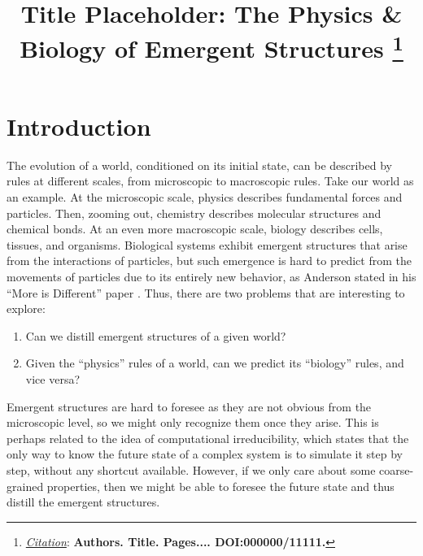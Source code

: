 \documentclass{article}
\title{Title Placeholder: The Physics \& Biology of Emergent Structures
\thanks{\textit{\underline{Citation}}: 
\textbf{Authors. Title. Pages.... DOI:000000/11111.}} 
}
\begin{document}
\maketitle


\begin{abstract}

\end{abstract}




\section{Introduction}

The evolution of a world, conditioned on its initial state, can be described by rules at different scales, from microscopic to macroscopic rules. 
Take our world as an example. 
At the microscopic scale, physics describes fundamental forces and particles. 
Then, zooming out, chemistry describes molecular structures and chemical bonds. 
At an even more macroscopic scale, biology describes cells, tissues, and organisms. 
Biological systems exhibit emergent structures that arise from the interactions of particles, but such emergence is hard to predict from the movements of particles due to its entirely new behavior, as Anderson stated in his ``More is Different'' paper \cite{anderson_more_1972}.  
Thus, there are two problems that are interesting to explore:
\begin{enumerate}
  \item Can we distill emergent structures of a given world?
  \item Given the ``physics'' rules of a world, can we predict its ``biology'' rules, and vice versa?
\end{enumerate}

Emergent structures are hard to foresee as they are not obvious from the microscopic level, so we might only recognize them once they arise. 
This is perhaps related to the idea of computational irreducibility, which states that the only way to know the future state of a complex system is to simulate it step by step, without any shortcut available. 
However, if we only care about some coarse-grained properties, then we might be able to foresee the future state and thus distill the emergent structures.
\end{document}

